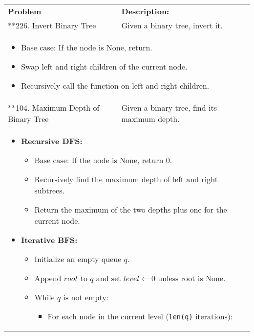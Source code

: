 \begin{summary}
    \begin{center}
        \begin{tabular}{ll}
            \toprule
            \textbf{Problem} & \textbf{Description:} \\
            **226. Invert Binary Tree & Given a binary tree, invert it. \\
            \multicolumn{2}{p{\linewidth}}{
                \begin{itemize}
                    \item Base case: If the node is None, return.
                    \item Swap left and right children of the current node.
                    \item Recursively call the function on left and right children.
                \end{itemize}
            } \\
            \midrule
            **104. Maximum Depth of Binary Tree & Given a binary tree, find its maximum depth. \\
            \multicolumn{2}{p{\linewidth}}{
                \begin{itemize}
                    \item \textbf{Recursive DFS:}
                    \begin{itemize}
                        \item Base case: If the node is None, return 0.
                        \item Recursively find the maximum depth of left and right subtrees.
                        \item Return the maximum of the two depths plus one for the current node.
                    \end{itemize}
                    \item \textbf{Iterative BFS:}
                    \begin{itemize}
                        \item Initialize an empty queue $q$.
                        \item Append $root$ to $q$ and set $level \gets 0$ unless root is None.
                        \item While $q$ is not empty:
                        \begin{itemize}
                            \item For each node in the current level (\texttt{len(q)} iterations):

\end{itemize}
\end{itemize}
\end{itemize}}
\end{tabular}
\end{center}
\end{summary}
